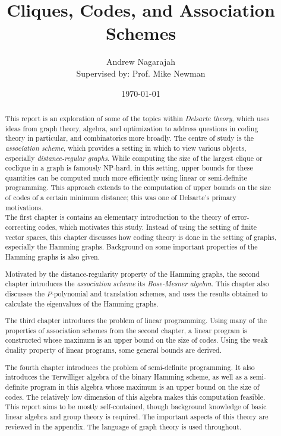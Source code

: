 \documentclass{report}
\title{Cliques, Codes, and Association Schemes}
\author{
  Andrew Nagarajah \\
  Supervised by: Prof. Mike Newman
}
\date{\today}
\begin{document}
\maketitle

\begin{abstract}

  This report is an exploration of some of the topics within \emph{Delsarte
  theory}, which uses ideas from graph theory, algebra, and optimization to
  address questions in coding theory in particular, and combinatorics more
  broadly.  The centre of study is the \emph{association scheme}, which provides
  a setting in which to view various objects, especially \emph{distance-regular
  graphs}.  While computing the size of the largest clique or coclique in a
  graph is famously NP-hard, in this setting, upper bounds for these quantities
  can be computed much more efficiently using linear or semi-definite
  programming.  This approach extends to the computation of upper bounds on the
  size of codes of a certain minimum distance; this was one of Delsarte's
  primary motivations.
  \\

  The first chapter is contains an elementary introduction to the theory of
  error-correcting codes, which motivates this study.  Instead of using the
  setting of finite vector spaces, this chapter discusses how coding theory is
  done in the setting of graphs, especially the Hamming graphs.  Background on
  some important properties of the Hamming graphs is also given.

  Motivated by the distance-regularity property of the Hamming graphs, the
  second chapter introduces the \emph{association scheme} its \emph{Bose-Mesner
  algebra}.  This chapter also discusses the $P$-polynomial and translation
  schemes, and uses the results obtained to calculate the eigenvalues of the
  Hamming graphs.

  The third chapter introduces the problem of linear programming.  Using many
  of the properties of association schemes from the second chapter, a linear
  program is constructed whose maximum is an upper bound on the size of codes.
  Using the weak duality property of linear programs, some general bounds are
  derived.

  The fourth chapter introduces the problem of semi-definite programming.  It
  also introduces the Terwilliger algebra of the binary Hamming scheme, as well
  as a semi-definite program in this algebra whose maximum is an upper bound on
  the size of codes.  The relatively low dimension of this algebra makes this
  computation feasible.
  \\

  This report aims to be mostly self-contained, though background knowledge of
  basic linear algebra and group theory is required.  The important aspects of
  this theory are reviewed in the appendix.  The language of graph theory is
  used throughout.

\end{abstract}
\end{document}
